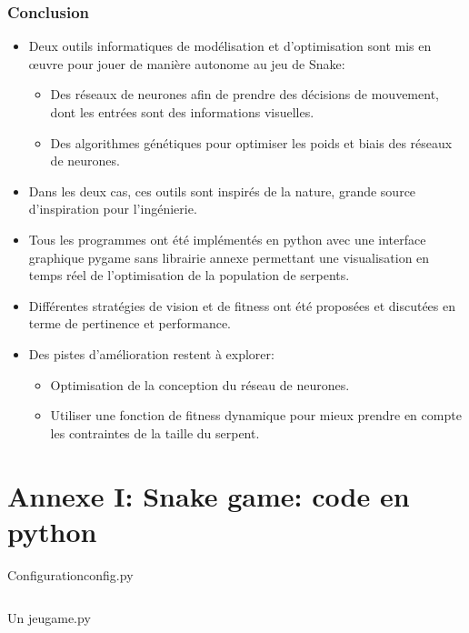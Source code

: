 \documentclass[10pt]{beamer}
\begin{document}
\begin{frame}
\frametitle{Conclusion}
\footnotesize
\begin{itemize}
\footnotesize
\item Deux outils informatiques de modélisation et d'optimisation sont mis en \oe{}uvre pour jouer de manière autonome au jeu de Snake:
  \begin{itemize}
  \footnotesize
  \item Des réseaux de neurones afin de prendre des décisions de mouvement, dont les entrées sont des informations visuelles.
  \item Des algorithmes génétiques pour optimiser les poids et biais des réseaux de neurones.
  \end{itemize}
\item Dans les deux cas, ces outils sont inspirés de la nature, grande source d'inspiration pour l'ingénierie.
\item Tous les programmes ont été implémentés en python avec une interface graphique pygame sans librairie annexe permettant une visualisation en temps réel de l'optimisation de la population de serpents.
\item Différentes stratégies de vision et de fitness ont été proposées et discutées en terme de pertinence et performance.
\item Des pistes d'amélioration restent à explorer:
  \begin{itemize}
  \footnotesize
  \item Optimisation de la conception du réseau de neurones.
  \item Utiliser une fonction de fitness dynamique pour mieux prendre en compte les contraintes de la taille du serpent.
  \end{itemize}
\end{itemize}
\end{frame}


\section{Annexe I: \textbf{Snake game: code en python}}

\begin{frame}[t,allowframebreaks]{Configuration}{config.py}
\scriptsize
\inputminted[mathescape]{python}{../../snake-the-game/config.py}
\end{frame}

\begin{frame}[t,allowframebreaks]{Un jeu}{game.py}
\scriptsize
\inputminted[mathescape]{python}{../../snake-the-game/game.py}
\end{frame}
\end{document}
